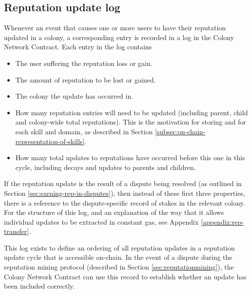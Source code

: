 \subsection{Reputation update log}\label{subsec:reputation-update-log}

Whenever an event that causes one or more users to have their reputation updated in a colony, a corresponding entry is recorded in a log in the Colony Network Contract. Each entry in the log contains

\begin{itemize}
\item The user suffering the reputation loss or gain.
\item The amount of reputation to be lost or gained.
\item The colony the update has occurred in.
\item How many reputation entries will need to be updated (including parent, child and colony-wide total reputations). This is the motivation for storing  and  for each skill and domain, as described in Section \ref{subsec:on-chain-representation-of-skills}.
\item How many total updates to reputations have occurred before this one in this cycle, including decays and updates to parents and children.
\end{itemize}

If the reputation update is the result of a dispute being resolved (as outlined in Section \ref{sec:earning-rep-in-disputes}), then instead of these first three properties, there is a reference to the dispute-specific record of stakes in the relevant colony. For the structure of this log, and an explanation of the way that it allows individual updates to be extracted in constant gas, see Appendix \ref{appendix:rep-transfer}.

This log exists to define an ordering of all reputation updates in a reputation update cycle that is accessible on-chain. In the event of a dispute during the reputation mining protocol (described in Section \ref{sec:reputationmining}), the Colony Network Contract can use this record to establish whether an update has been included correctly.

